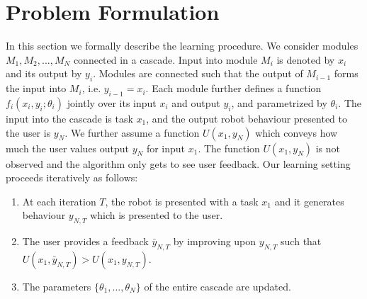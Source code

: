 \section{Problem Formulation}
In this section we formally describe the learning procedure. We consider modules $M_1,M_2,...,M_N$ connected in a cascade. Input into  module $M_i$ is denoted by $x_i$ and its output by $y_i$.  Modules are connected such that the output of $M_{i-1}$ forms the input into $M_i$, i.e. $y_{i-1} = x_i$. Each module further defines a function $f_i(x_i,y_i;\theta_i)$ jointly over its input $x_i$ and output $y_i$, and parametrized by $\theta_i$. The input into the cascade is task $x_1$, and the output robot behaviour presented to the user is $y_N$. 	We further assume a function $U(x_1,y_N)$ which conveys how much the user values output $y_N$ for input $x_1$. The function $U(x_1,y_N)$ is not observed and the algorithm only gets to see user feedback. Our learning setting proceeds iteratively as follows:
\begin{enumerate}
\item At each iteration $T$, the robot is presented with a task $x_1$ and it generates behaviour $y_{N,T}$ which is presented to the user.
\item The user provides a feedback $\bar{y}_{N,T}$ by improving upon ${y}_{N,T}$ such that $U(x_1,\bar{y}_{N,T}) > U(x_1,{y}_{N,T})$.
\item The parameters $\{\theta_1,...,\theta_N\}$ of the entire cascade are updated.
\end{enumerate} 

